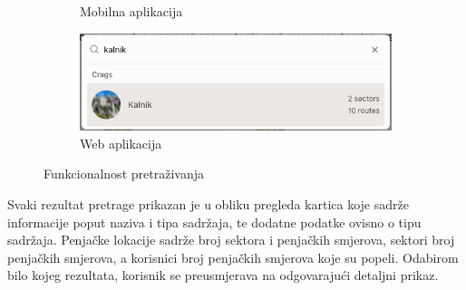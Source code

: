 \begin{figure}[H]
\begin{subfigure}[b]{0.35\textwidth}
        \caption{Mobilna aplikacija}
        \label{fig:pretrazivanje_web_1}
    \end{subfigure}
    \hfill
    \begin{subfigure}[b]{0.6\textwidth}
        \centering
        \includegraphics[width=\textwidth]{images/implementacija/web/search_searching.png}
        \caption{Web aplikacija}
        \label{fig:pretrazivanje_web_2}
    \end{subfigure}
    \caption{Funkcionalnost pretraživanja}
    \label{fig:pretrazivanje_side_by_side}
\end{figure}

Svaki rezultat pretrage prikazan je u obliku pregleda kartica koje sadrže informacije poput naziva i tipa sadržaja, te dodatne podatke ovisno o tipu sadržaja. Penjačke lokacije sadrže broj sektora i penjačkih smjerova, sektori broj penjačkih smjerova, a korisnici broj penjačkih smjerova koje su popeli. Odabirom bilo kojeg rezultata, korisnik se preusmjerava na odgovarajući detaljni prikaz. 

